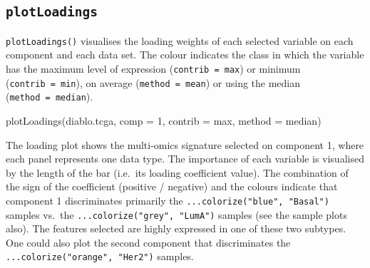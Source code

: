 \documentclass[
]{book}
\newenvironment{Shaded}{\begin{snugshade}}{\end{snugshade}}
\newcommand{\AttributeTok}[1]{\textcolor[rgb]{0.77,0.63,0.00}{#1}}
\newcommand{\CommentTok}[1]{\textcolor[rgb]{0.56,0.35,0.01}{\textit{#1}}}
\newcommand{\DecValTok}[1]{\textcolor[rgb]{0.00,0.00,0.81}{#1}}
\newcommand{\FloatTok}[1]{\textcolor[rgb]{0.00,0.00,0.81}{#1}}
\newcommand{\FunctionTok}[1]{\textcolor[rgb]{0.00,0.00,0.00}{#1}}
\newcommand{\NormalTok}[1]{#1}
\newcommand{\OtherTok}[1]{\textcolor[rgb]{0.56,0.35,0.01}{#1}}
\newcommand{\SpecialCharTok}[1]{\textcolor[rgb]{0.00,0.00,0.00}{#1}}
\newcommand{\StringTok}[1]{\textcolor[rgb]{0.31,0.60,0.02}{#1}}
\begin{document}
\begin{Shaded}
\end{Shaded}

\hypertarget{plotloadings}{%
\subsection{\texorpdfstring{\texttt{plotLoadings}}{plotLoadings}}\label{plotloadings}}

\texttt{plotLoadings()} visualises the loading weights of each selected variable on each component and each data set. The colour indicates the class in which the variable has the maximum level of expression (\texttt{contrib\ =\ \textquotesingle{}max\textquotesingle{}}) or minimum (\texttt{contrib\ =\ \textquotesingle{}min\textquotesingle{}}), on average (\texttt{method\ =\ \textquotesingle{}mean\textquotesingle{}}) or using the median (\texttt{method\ =\ \textquotesingle{}median\textquotesingle{}}).

\begin{Shaded}
\begin{Highlighting}[]
\FunctionTok{plotLoadings}\NormalTok{(diablo.tcga, }\AttributeTok{comp =} \DecValTok{1}\NormalTok{, }\AttributeTok{contrib =} \StringTok{\textquotesingle{}max\textquotesingle{}}\NormalTok{, }\AttributeTok{method =} \StringTok{\textquotesingle{}median\textquotesingle{}}\NormalTok{)}
\end{Highlighting}
\end{Shaded}



The loading plot shows the multi-omics signature selected on component 1, where each panel represents one data type. The importance of each variable is visualised by the length of the bar (i.e.~its loading coefficient value). The combination of the sign of the coefficient (positive / negative) and the colours indicate that component 1 discriminates primarily the \texttt{...colorize("blue",\ "Basal")} samples vs.~the \texttt{...colorize("grey",\ "LumA")} samples (see the sample plots also). The features selected are highly expressed in one of these two subtypes. One could also plot the second component that discriminates the \texttt{...colorize("orange",\ "Her2")} samples.
\end{document}
